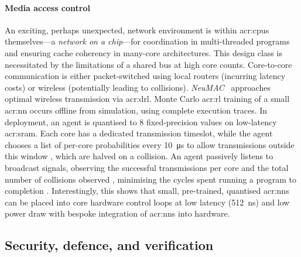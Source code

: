 \paragraph{Media access control}
An exciting, perhaps unexpected, network environment is within \glspl{acr:cpu} themselves---a \emph{network on a chip}---for coordination in multi-threaded programs and ensuring cache coherency in many-core architectures.
This design class is necessitated by the limitations of a shared bus at high core counts.
Core-to-core communication is either packet-switched using local routers (incurring latency costs) or wireless (potentially leading to collisions).
\emph{NeuMAC}~\parencite{DBLP:conf/nsdi/JogLFFATH21} approaches optimal wireless transmission via \gls{acr:drl}.
Monte Carlo \gls{acr:rl} training of a small \gls{acr:nn} occurs offline from simulation, using complete execution traces.
In deployment, an agent is quantised to \qty{8}{\bit} fixed-precision values on low-latency \gls{acr:sram}.
Each core has a dedicated transmission timeslot, while the agent chooses a list of per-core probabilities every \qty{10}{\micro\second} to allow transmissions outside this window \prllitactreal{}, which are halved on a collision.
An agent passively listens to broadcast signals, observing the successful transmissions per core and the total number of collisions observed \prllitstate{}, minimising the cycles spent running a program to completion \prllitreward{}.
Interestingly, this shows that small, pre-trained, quantised \glspl{acr:nn} can be placed into core hardware control loops at low latency (\qty{512}{\nano\second}) and low power draw with bespoke integration of \glspl{acr:nn} into hardware.


\subsection{Security, defence, and verification}\label{sec:ddn-uses-security}

